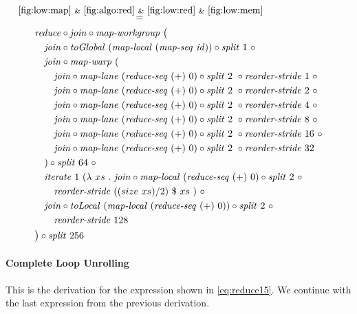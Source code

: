 \begin{align*}
%
  &\hspace{-2em}\quad\begin{aligned}
    &\overset{\ref{fig:low:map}\ \&\ \ref{fig:algo:red}\ \&\ \ref{fig:low:red}\ \&\ \ref{fig:low:mem}}{=\hspace{.2em}}\\
    &\qquad
      \reduce \circ \join \circ \mapWorkgroup\ \big(\\
    &\qquad\quad \join \circ \toGlobal\ (\mapLocal\ (\mapSeq\ \id)) \circ \splitN\ 1\ \circ\\
    &\qquad\quad \join \circ \mapWarp\ (\\
    &\qquad\qquad \join \circ \mapLane\ (\reduceSeq\ (+)\ 0) \circ \splitN\ 2\ \circ \reorderStride\ 1\ \circ\\
    &\qquad\qquad \join \circ \mapLane\ (\reduceSeq\ (+)\ 0) \circ \splitN\ 2\ \circ \reorderStride\ 2\ \circ\\
    &\qquad\qquad \join \circ \mapLane\ (\reduceSeq\ (+)\ 0) \circ \splitN\ 2\ \circ \reorderStride\ 4\ \circ\\
    &\qquad\qquad \join \circ \mapLane\ (\reduceSeq\ (+)\ 0) \circ \splitN\ 2\ \circ \reorderStride\ 8\ \circ\\
    &\qquad\qquad \join \circ \mapLane\ (\reduceSeq\ (+)\ 0) \circ \splitN\ 2\ \circ \reorderStride\ 16\ \circ\\
    &\qquad\qquad \join \circ \mapLane\ (\reduceSeq\ (+)\ 0) \circ \splitN\ 2\ \circ \reorderStride\ 32\\
    &\qquad\quad) \circ \splitN\ 64\ \circ\\
    &\qquad\quad \iterateN\ 1\ (\lambda\ xs\ .\ \join \circ \mapLocal\ (\reduceSeq\ (+)\ 0) \circ \splitN\ 2\ \circ\\
    &\qquad\qquad \reorderStride\ ((size\ xs)/2)\ \$\ xs\ )\ \circ\\
    &\qquad\quad \join \circ \toLocal\ (\mapLocal\ (\reduceSeq\ (+)\ 0)) \circ \splitN\ 2\ \circ\\
    &\qquad\qquad \reorderStride\ 128\\
    &\qquad\big) \circ \splitN\ 256
  \end{aligned}
%  
\end{align*}

\normalsize


\paragraph{Complete Loop Unrolling}
This is the derivation for the expression shown in \autoref{eq:reduce15}.
We continue with the last expression from the previous derivation.


